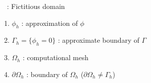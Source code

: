 \begin{frame}{\appendixname~\theappendixframenumber~: Fictitious domain}
	
	\vspace{10pt}
	
	\begin{center}
		\begin{minipage}{0.43\linewidth}
			\centering
		\end{minipage} \hfill
		\begin{minipage}{0.1\linewidth}
			\centering
		\end{minipage} \hfill
		\begin{minipage}{0.43\linewidth}
			\centering
		\end{minipage}
	\end{center}
	
	\begin{enumerate}[\ding{217}]
		\item $\phi_h$ : approximation of $\phi$ \\ 
		\item $\Gamma_h=\{\phi_h=0\}$ : approximate boundary of $\Gamma$
		\item $\Omega_h$ : computational mesh
		\item $\partial\Omega_h$ : boundary of $\Omega_h$ ($\partial\Omega_h \ne \Gamma_h$)
	\end{enumerate}	
	
	

\end{frame}
